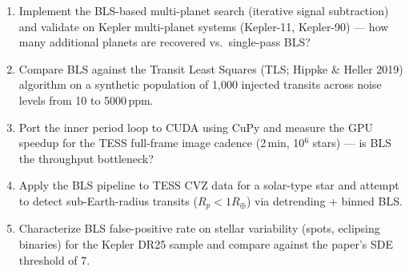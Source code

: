 \begin{enumerate}[leftmargin=1.6em,itemsep=0.2em,topsep=0.2em,label=Q\arabic*.]
\item Implement the BLS-based multi-planet search (iterative signal subtraction) and validate on Kepler multi-planet systems (Kepler-11, Kepler-90) --- how many additional planets are recovered vs.\ single-pass BLS?
\item Compare BLS against the Transit Least Squares (TLS; Hippke \& Heller 2019) algorithm on a synthetic population of 1,000 injected transits across noise levels from 10 to 5000\,ppm.
\item Port the inner period loop to CUDA using CuPy and measure the GPU speedup for the TESS full-frame image cadence (2\,min, 10$^6$ stars) --- is BLS the throughput bottleneck?
\item Apply the BLS pipeline to TESS CVZ data for a solar-type star and attempt to detect sub-Earth-radius transits ($R_p < 1 R_\oplus$) via detrending + binned BLS.
\item Characterize BLS false-positive rate on stellar variability (spots, eclipsing binaries) for the Kepler DR25 sample and compare against the paper's SDE threshold of 7.
\end{enumerate}

